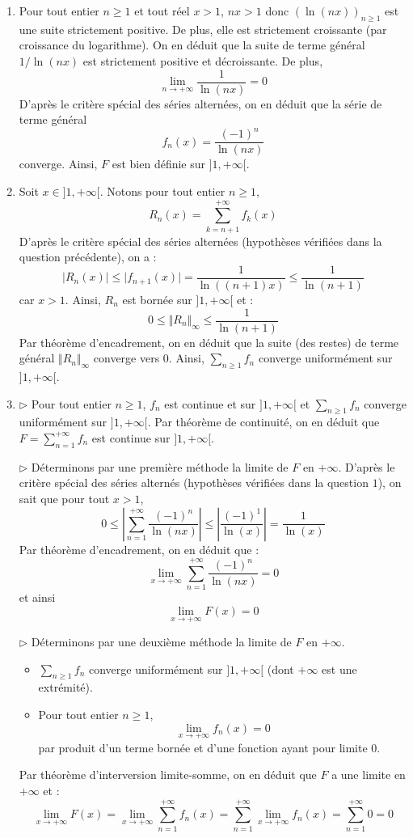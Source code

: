 \documentclass[a4paper,10pt]{report}
\newcommand{\Sum}[2]{\ensuremath{\textstyle{\sum\limits_{#1}^{#2}}}}
\begin{document}
\begin{enumerate}
\item Pour tout entier $n \geq 1$ et tout réel $x>1$, $nx>1$ donc $(\ln(nx))_{n \geq 1}$ est une suite strictement positive. De plus, elle est strictement croissante (par croissance du logarithme). On en déduit que la suite de terme général $1/\ln(nx)$ est strictement positive et décroissante. De plus,
$$ \lim_{n \rightarrow + \infty} \dfrac{1}{\ln(nx)} = 0$$
D'après le critère spécial des séries alternées, on en déduit que la série de terme général 
$$ f_n(x)  =\frac{(-1)^n}{\ln(nx)}$$
converge. Ainsi, $F$ est bien définie sur $]1, + \infty[$.
\item Soit $x \in ]1, + \infty[$. Notons pour tout entier $n \geq 1$,
$$ R_n(x) = \sum_{k=n+1}^{+ \infty} f_k(x)$$
D'après le critère spécial des séries alternées (hypothèses vérifiées dans la question précédente), on a :
$$ \vert R_n(x) \vert \leq \vert f_{n+1}(x) \vert  = \dfrac{1}{\ln((n+1)x)} \leq \dfrac{1}{\ln(n+1)}$$
car $x>1$. Ainsi, $R_n$ est bornée sur $]1, + \infty[$ et :
$$ 0 \leq \Vert R_n \Vert_{\infty} \leq \dfrac{1}{\ln(n+1)}$$
Par théorème d'encadrement, on en déduit que la suite (des restes) de terme général $ \Vert R_n \Vert_{\infty}$ converge vers $0$. Ainsi, $\Sum{n\geq 1}{} f_n$ converge uniformément sur $]1,+\infty[.$ 
\item 

\noindent $\rhd$ Pour tout entier $n \geq 1$, $f_n$ est continue et sur $]1, + \infty[$ et $\Sum{n\geq 1}{} f_n$ converge uniformément sur $]1,+\infty[.$ Par théorème de continuité, on en déduit que $F= \Sum{n= 1}{+ \infty} f_n$ est continue sur $]1, + \infty[$.

\medskip

\noindent $\rhd$ Déterminons par une première méthode la limite de $F$ en $+ \infty$. D'après le critère spécial des séries alternés (hypothèses vérifiées dans la question $1$), on sait que pour tout $x>1$,
$$ 0 \leq \left\vert \sum_{n=1}^{+ \infty} \dfrac{(-1)^n}{\ln(nx)} \right\vert \leq \left\vert \dfrac{(-1)^1}{\ln(x)} \right\vert = \dfrac{1}{\ln(x)}$$
Par théorème d'encadrement, on en déduit que :
$$ \lim_{x \rightarrow + \infty} \sum_{n=1}^{+ \infty} \dfrac{(-1)^n}{\ln(nx)} = 0$$
et ainsi
$$ \lim_{x \rightarrow + \infty} F(x)= 0$$

\medskip

\noindent $\rhd$ Déterminons par une deuxième méthode la limite de $F$ en $+ \infty$.

\begin{itemize}
\item $\Sum{n\geq 1}{} f_n$ converge uniformément sur $]1,+\infty[$ (dont $+ \infty$ est une extrémité).
\item Pour tout entier $n \geq 1$,
$$ \lim_{x \rightarrow + \infty} f_n(x) = 0$$
par produit d'un terme bornée et d'une fonction ayant pour limite $0$.
\end{itemize}
Par théorème d'interversion limite-somme, on en déduit que $F$ a une limite en $+ \infty$ et :
$$ \lim_{x \rightarrow + \infty}  F(x) = \lim_{x \rightarrow + \infty} \sum_{n=1}^{+ \infty} f_n(x) =  \sum_{n=1}^{+ \infty} \lim_{x \rightarrow + \infty} f_n(x)=   \sum_{n=1}^{+ \infty}  0 = 0$$


\end{enumerate}
\end{document}
